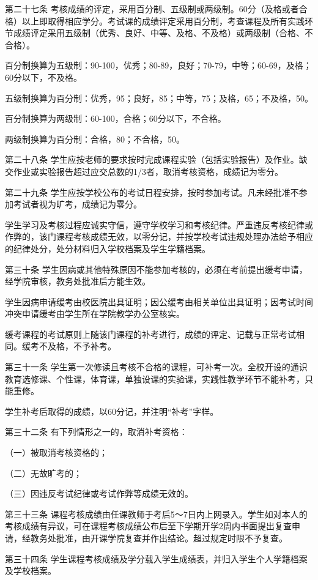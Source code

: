 \documentclass[UTF8,12pt,a4paper]{report}
\begin{document}
第二十七条  考核成绩的评定，采用百分制、五级制或两级制。60分（及格或者合格）以上即取得相应学分。考试课的成绩评定采用百分制，考查课程及所有实践环节成绩评定采用五级制（优秀、良好、中等、及格、不及格）或两级制（合格、不合格）。

百分制换算为五级制：90-100，优秀；80-89，良好；70-79，中等；60-69，及格；60分以下，不及格。

五级制换算为百分制：优秀，95；良好，85；中等，75；及格，65；不及格，50。

百分制换算为两级制：60-100，合格；60分以下，不合格。

两级制换算为百分制：合格，80；不合格，50。

第二十八条  学生应按老师的要求按时完成课程实验（包括实验报告）及作业。缺交作业或实验报告超过应交总数的1/3者，取消考核资格，成绩记为零分。

第二十九条  学生应按学校公布的考试日程安排，按时参加考试。凡未经批准不参加考试者视为旷考，成绩记为零分。

学生学习及考核过程应诚实守信，遵守学校学习和考核纪律。严重违反考核纪律或作弊的，该门课程考核成绩无效，以零分记，并按学校考试违规处理办法给予相应的纪律处分，处分材料归入学校档案及学生学籍档案。

第三十条  学生因病或其他特殊原因不能参加考核的，必须在考前提出缓考申请，经学院审核，教务处批准后方能生效。

学生因病申请缓考由校医院出具证明；因公缓考由相关单位出具证明；因考试时间冲突申请缓考由学生所在学院教学办公室核实。

缓考课程的考试原则上随该门课程的补考进行，成绩的评定、记载与正常考试相同。缓考不及格，不予补考。

第三十一条  学生第一次修读且考核不合格的课程，可补考一次。全校开设的通识教育选修课、个性课，体育课，单独设课的实验课，实践性教学环节不能补考，只能重修。

学生补考后取得的成绩，以60分记，并注明“补考”字样。

第三十二条  有下列情形之一的，取消补考资格：

（一）被取消考核资格的；

（二）无故旷考的；

（三）因违反考试纪律或考试作弊等成绩无效的。

第三十三条  课程考核成绩由任课教师于考后5～7日内上网录入。学生如对本人的考核成绩有异议，可在课程考核成绩公布后至下学期开学2周内书面提出复查申请，经教务处批准，由开课学院复查并作出结论。超过规定时限不予复查。

第三十四条  学生课程考核成绩及学分载入学生成绩表，并归入学生个人学籍档案及学校档案。
\end{document}
